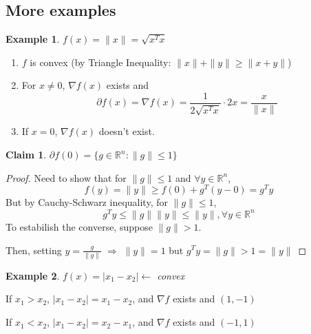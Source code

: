 \documentclass[11pt,a4paper]{article}
\newtheorem{claim}{Claim}
\newtheorem{example}{Example}
\begin{document}
\subsection{More examples}
\begin{example}
    $f(x)=\|x\|=\sqrt{x^Tx}$
\end{example}
\begin{enumerate}[$\bullet$]
    \item $f$ is convex (by Triangle Inequality: $\|x\|+\|y\|\geq \|x+y\|$)
    \item For $x\neq 0$, $\nabla f(x)$ exists and $$\partial f(x)= \nabla f(x) =\frac{1}{2\sqrt{x^Tx}}\cdot 2x=\frac{x}{\|x\|}$$
    \item If $x=0$, $\nabla f(x)$ doesn't exist.
\end{enumerate}
\begin{claim}
    $\partial f(0)=\{g\in \mathbb{R}^n:\|g\|\leq 1\}$
\end{claim}
\begin{proof}
    Need to show that for $\|g\|\leq 1$ and $\forall y\in \mathbb{R}^n$, $$f(y)=\|y\|\geq f(0)+g^T(y-0)=g^T y$$
    But by Cauchy-Schwarz inequality, for $\|g\|\leq 1$, $$g^Ty\leq \|g\|\|y\|\leq \|y\|,\forall y\in \mathbb{R}^n$$
    To estabilish the converse, suppose $\|g\|>1$.

    Then, setting $y=\frac{g}{\|g\|}$ $\Rightarrow$ $\|y\|=1$ but $g^Ty=\|g\|>1=\|y\|$
\end{proof}

\begin{example}
    $f(x)=|x_1-x_2|\leftarrow$ convex
\end{example}
If $x_1>x_2$, $|x_1-x_2|=x_1-x_2$, and $\nabla f$ exists and $(1,-1)$

If $x_1<x_2$, $|x_1-x_2|=x_2-x_1$, and $\nabla f$ exists and $(-1,1)$
\end{document}
